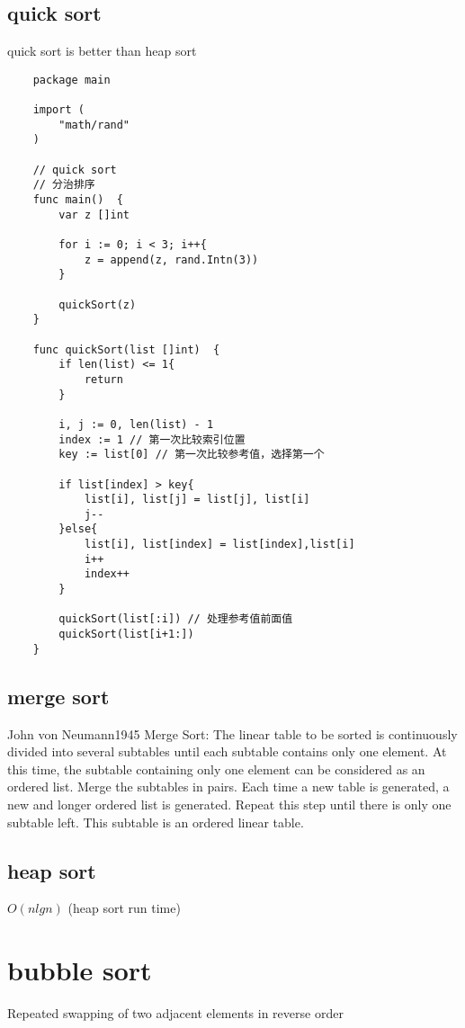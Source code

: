 \documentclass[oneside,12pt,twiside,a4paper]{ctexbook}
\begin{document}
\subsection{quick sort}
quick sort is better than heap sort
\begin{lstlisting}
    package main

    import (
        "math/rand"
    )
    
    // quick sort
    // 分治排序
    func main()  {
        var z []int
    
        for i := 0; i < 3; i++{
            z = append(z, rand.Intn(3))
        }
        
        quickSort(z)	
    }
    
    func quickSort(list []int)  {
        if len(list) <= 1{
            return
        }
    
        i, j := 0, len(list) - 1
        index := 1 // 第一次比较索引位置
        key := list[0] // 第一次比较参考值，选择第一个
    
        if list[index] > key{
            list[i], list[j] = list[j], list[i]
            j--
        }else{
            list[i], list[index] = list[index],list[i]
            i++
            index++
        }
    
        quickSort(list[:i]) // 处理参考值前面值
        quickSort(list[i+1:])
    }
\end{lstlisting}
%
\subsection{merge sort}
John von Neumann1945
Merge Sort:
The linear table to be sorted is continuously divided into several subtables until each 
subtable contains only one element. 
At this time, the subtable containing only one element can be considered as an ordered list.
Merge the subtables in pairs. Each time a new table is generated, 
a new and longer ordered list is generated. 
Repeat this step until there is only one subtable left. 
This subtable is an ordered linear table.
%
\subsection{heap sort}
$O(nlgn)$ (heap sort run time)

%
\section{bubble sort}
Repeated swapping of two adjacent elements in reverse order
\end{document}
